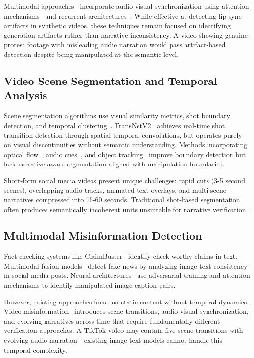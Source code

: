 \documentclass[runningheads]{llncs}
\begin{document}
Multimodal approaches~\cite{multimodal_deepfake} incorporate audio-visual synchronization using attention mechanisms~\cite{attention_deepfake} and recurrent architectures~\cite{lstm_deepfake}. While effective at detecting lip-sync artifacts in synthetic videos, these techniques remain focused on identifying generation artifacts rather than narrative inconsistency. A video showing genuine protest footage with misleading audio narration would pass artifact-based detection despite being manipulated at the semantic level.

\subsection{Video Scene Segmentation and Temporal Analysis}

Scene segmentation algorithms use visual similarity metrics, shot boundary detection, and temporal clustering~\cite{scene_segmentation}. TransNetV2~\cite{transnet} achieves real-time shot transition detection through spatial-temporal convolutions, but operates purely on visual discontinuities without semantic understanding. Methods incorporating optical flow~\cite{optical_flow_segmentation}, audio cues~\cite{audio_scene}, and object tracking~\cite{semantic_scene} improve boundary detection but lack narrative-aware segmentation aligned with manipulation boundaries.

Short-form social media videos present unique challenges: rapid cuts (3-5 second scenes), overlapping audio tracks, animated text overlays, and multi-scene narratives compressed into 15-60 seconds. Traditional shot-based segmentation often produces semantically incoherent units unsuitable for narrative verification.

\subsection{Multimodal Misinformation Detection}

Fact-checking systems like ClaimBuster~\cite{claimbuster} identify check-worthy claims in text. Multimodal fusion models~\cite{multimodal_fusion,cross_modal_verify} detect fake news by analyzing image-text consistency in social media posts. Neural architectures~\cite{fake_news_detection,fake_news_nn} use adversarial training and attention mechanisms to identify manipulated image-caption pairs.

However, existing approaches focus on static content without temporal dynamics. Video misinformation~\cite{video_misinformation} introduces scene transitions, audio-visual synchronization, and evolving narratives across time that require fundamentally different verification approaches. A TikTok video may contain five scene transitions with evolving audio narration - existing image-text models cannot handle this temporal complexity.
\end{document}
